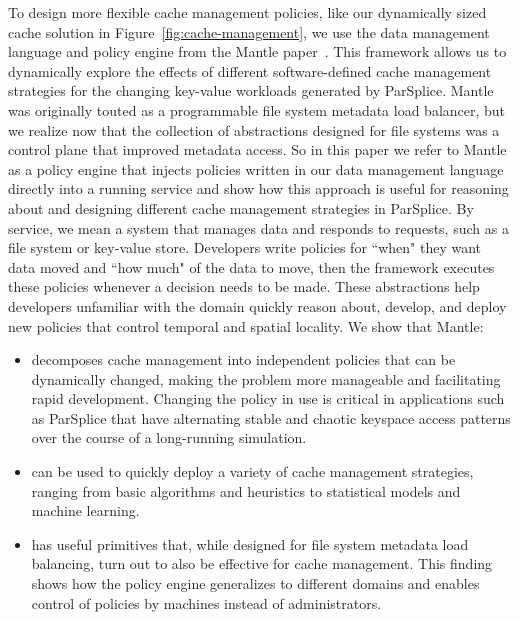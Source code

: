 To design more flexible cache management policies, like our dynamically sized
cache solution in Figure~\ref{fig:cache-management}, we use the data management
language and policy engine from the Mantle paper~\cite{sevilla:sc15-mantle}.
This framework allows us to dynamically explore the effects of different
software-defined cache management strategies for the changing key-value
workloads generated by ParSplice.  Mantle was originally touted as a
programmable file system metadata load balancer, but we realize now that the
collection of abstractions designed for file systems was a control plane that
improved metadata access. So in this paper we refer to Mantle as a policy
engine that injects policies written in our data management language directly
into a running service and show how this approach is useful for reasoning about
and designing different cache management strategies in ParSplice.  By service,
we mean a system that manages data and responds to requests, such as a file
system or key-value store.  Developers write policies for ``when" they want
data moved and ``how much" of the data to move, then the framework executes
these policies whenever a decision needs to be made.  These abstractions help
developers unfamiliar with the domain quickly reason about, develop, and deploy
new policies that control temporal and spatial locality. We show that Mantle:

\begin{itemize}

  \item decomposes cache management into independent policies that can be
  dynamically changed, making the problem more manageable and facilitating rapid
  development. Changing the policy in use is critical in applications such as
  ParSplice that have alternating stable and chaotic keyspace access patterns
  over the course of a long-running simulation.  

  \item can be used to quickly deploy a variety of cache management strategies,
  ranging from basic algorithms and heuristics to statistical models and machine
  learning.

  \item has useful primitives that, while designed for file system metadata
  load balancing, turn out to also be effective for cache management. This
  finding shows how the policy engine generalizes to different domains and
  enables control of policies by machines instead of administrators.

\end{itemize}


